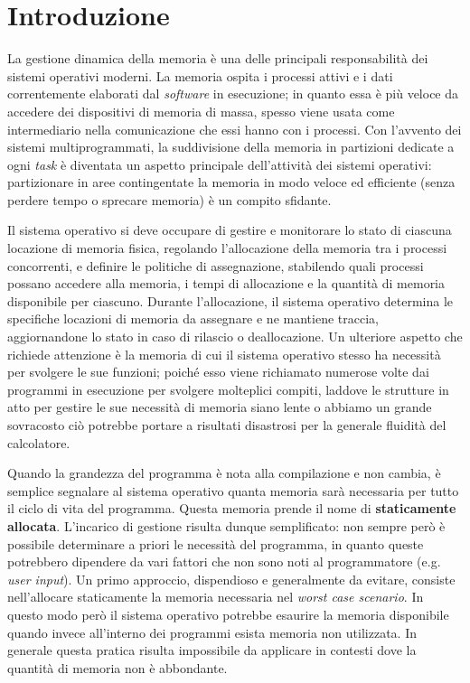 \chapter{Introduzione}

La gestione dinamica della memoria è una delle principali responsabilità dei sistemi operativi moderni\footnotemark. La memoria ospita i processi attivi e i dati correntemente elaborati dal \textit{software} in esecuzione; in quanto essa è più veloce da accedere dei dispositivi di memoria di massa, spesso viene usata come intermediario nella comunicazione che essi hanno con i processi. Con l'avvento dei sistemi multiprogrammati, la suddivisione della memoria in partizioni dedicate a ogni \textit{task} è diventata un aspetto principale dell'attività dei sistemi operativi: partizionare in aree contingentate la memoria in modo veloce ed efficiente (senza perdere tempo o sprecare memoria) è un compito sfidante. 

Il sistema operativo si deve occupare di gestire e monitorare lo stato di ciascuna locazione di memoria fisica, regolando l'allocazione della memoria tra i processi concorrenti, e definire le politiche di assegnazione, stabilendo quali processi possano accedere alla memoria, i tempi di allocazione e la quantità di memoria disponibile per ciascuno. Durante l'allocazione, il sistema operativo determina le specifiche locazioni di memoria da assegnare e ne mantiene traccia, aggiornandone lo stato in caso di rilascio o deallocazione. Un ulteriore aspetto che richiede attenzione è la memoria di cui il sistema operativo stesso ha necessità per svolgere le sue funzioni; poiché esso viene richiamato numerose volte dai programmi in esecuzione per svolgere molteplici compiti, laddove le strutture in atto per gestire le sue necessità di memoria siano lente o abbiamo un grande sovracosto ciò potrebbe portare a risultati disastrosi per la generale fluidità del calcolatore.

Quando la grandezza del programma è nota alla compilazione e non cambia, è semplice segnalare al sistema operativo quanta memoria sarà necessaria per tutto il ciclo di vita del programma. Questa memoria prende il nome di \textbf{staticamente allocata}. L'incarico di gestione risulta dunque semplificato: non sempre però è possibile determinare a priori le necessità del programma, in quanto queste potrebbero dipendere da vari fattori che non sono noti al programmatore (e.g. \textit{user input}). Un primo approccio, dispendioso e generalmente da evitare, consiste nell'allocare staticamente la memoria necessaria nel \textit{worst case scenario}. In questo modo però il sistema operativo potrebbe esaurire la memoria disponibile quando invece all'interno dei programmi esista memoria non utilizzata\footnotemark. In generale questa pratica risulta impossibile da applicare in contesti dove la quantità di memoria non è abbondante.

